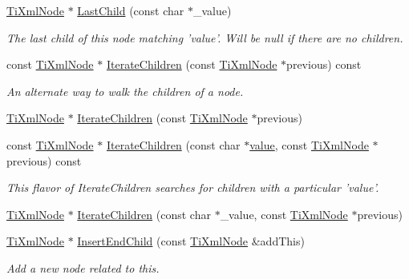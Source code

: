 \begin{DoxyCompactItemize}
\item 
\hyperlink{classTiXmlNode}{TiXmlNode} $\ast$ \hyperlink{classTiXmlNode_abad5bf1059c48127b958711ef89e8e5d}{LastChild} (const char $\ast$\_\-value)
\begin{DoxyCompactList}\small\item\em The last child of this node matching 'value'. Will be null if there are no children. \item\end{DoxyCompactList}\item 
const \hyperlink{classTiXmlNode}{TiXmlNode} $\ast$ \hyperlink{classTiXmlNode_aaef7ac3978c4bb1cc8a24ffae7bced75}{IterateChildren} (const \hyperlink{classTiXmlNode}{TiXmlNode} $\ast$previous) const 
\begin{DoxyCompactList}\small\item\em An alternate way to walk the children of a node. \item\end{DoxyCompactList}\item 
\hyperlink{classTiXmlNode}{TiXmlNode} $\ast$ \hyperlink{classTiXmlNode_a2358e747118fdbf0e467b1e4f7d03de1}{IterateChildren} (const \hyperlink{classTiXmlNode}{TiXmlNode} $\ast$previous)
\item 
const \hyperlink{classTiXmlNode}{TiXmlNode} $\ast$ \hyperlink{classTiXmlNode_af2b86dbe25d3d26fa48180edc5e2a9fc}{IterateChildren} (const char $\ast$\hyperlink{classTiXmlNode_aead528b3cedc33c16a6c539872c7cc8b}{value}, const \hyperlink{classTiXmlNode}{TiXmlNode} $\ast$previous) const 
\begin{DoxyCompactList}\small\item\em This flavor of IterateChildren searches for children with a particular 'value'. \item\end{DoxyCompactList}\item 
\hyperlink{classTiXmlNode}{TiXmlNode} $\ast$ \hyperlink{classTiXmlNode_a67ba8275e533e6f76340236c42ea0aea}{IterateChildren} (const char $\ast$\_\-value, const \hyperlink{classTiXmlNode}{TiXmlNode} $\ast$previous)
\item 
\hyperlink{classTiXmlNode}{TiXmlNode} $\ast$ \hyperlink{classTiXmlNode_af287a913ce46d8dbf7ef24fec69bbaf0}{InsertEndChild} (const \hyperlink{classTiXmlNode}{TiXmlNode} \&addThis)
\begin{DoxyCompactList}\small\item\em Add a new node related to this. \item\end{DoxyCompactList}\item 

\end{DoxyCompactItemize}
